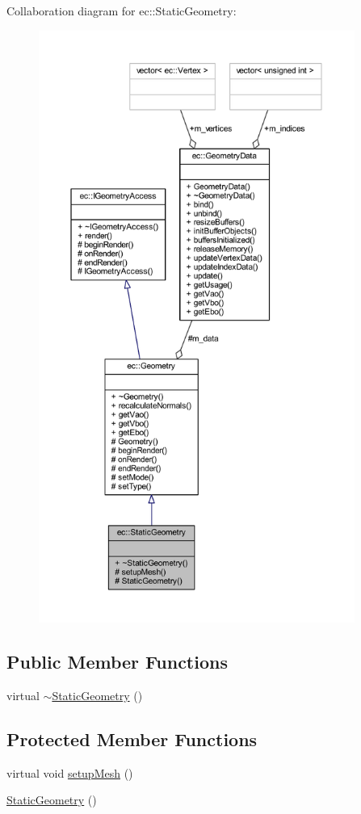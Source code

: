 Collaboration diagram for ec\+:\+:Static\+Geometry\+:\nopagebreak
\begin{figure}[H]
\begin{center}
\leavevmode
\includegraphics[height=550pt]{classec_1_1_static_geometry__coll__graph}
\end{center}
\end{figure}
\subsection*{Public Member Functions}
\begin{DoxyCompactItemize}
\item 
virtual \mbox{\hyperlink{classec_1_1_static_geometry_a47d1f09c1042762be9a9d4a492db2366}{$\sim$\+Static\+Geometry}} ()
\end{DoxyCompactItemize}
\subsection*{Protected Member Functions}
\begin{DoxyCompactItemize}
\item 
virtual void \mbox{\hyperlink{classec_1_1_static_geometry_a971d3c59c50d0ae540b95ecb77d5a05a}{setup\+Mesh}} ()
\item 
\mbox{\hyperlink{classec_1_1_static_geometry_ad707c706ce148f5c9d6d8ddb2321807b}{Static\+Geometry}} ()
\end{DoxyCompactItemize}
